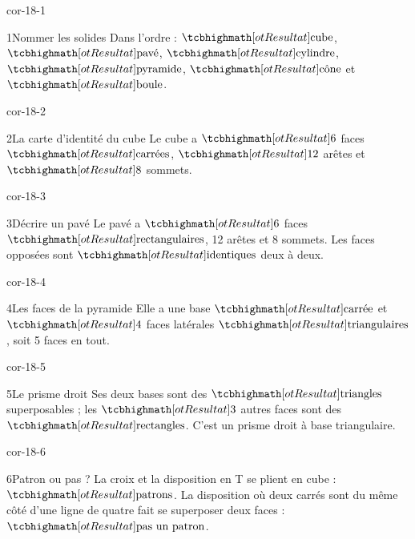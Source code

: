 \clearpage\pagestyle{otMain}\setlength{\otBlocEspacement}{2.5mm}\fontsize{11}{15}\selectfont{}
\begin{blocLivre}{cor-18-1}\begin{corrige}{1}{Nommer les solides}
Dans l’ordre : $\res{\text{cube}}$, $\res{\text{pavé}}$, $\res{\text{cylindre}}$, $\res{\text{pyramide}}$, $\res{\text{cône}}$ et $\res{\text{boule}}$.
\label{fig-cor-18-1}
\end{corrige}\end{blocLivre}
\begin{blocLivre}{cor-18-2}\begin{corrige}{2}{La carte d’identité du cube}
Le cube a $\res6$ faces $\res{\text{carrées}}$, $\res{12}$ arêtes et $\res8$ sommets.
\label{fig-cor-18-2}
\end{corrige}\end{blocLivre}
\begin{blocLivre}{cor-18-3}\begin{corrige}{3}{Décrire un pavé}
Le pavé a $\res6$ faces $\res{\text{rectangulaires}}$, 12 arêtes et 8 sommets. Les faces opposées sont $\res{\text{identiques}}$ deux à deux.
\label{fig-cor-18-3}
\end{corrige}\end{blocLivre}
\begin{blocLivre}{cor-18-4}\begin{corrige}{4}{Les faces de la pyramide}
Elle a une base $\res{\text{carrée}}$ et $\res4$ faces latérales $\res{\text{triangulaires}}$, soit 5 faces en tout.
\label{fig-cor-18-4}
\end{corrige}\end{blocLivre}
\begin{blocLivre}{cor-18-5}\begin{corrige}{5}{Le prisme droit}
Ses deux bases sont des $\res{\text{triangles}}$ superposables ; les $\res3$ autres faces sont des $\res{\text{rectangles}}$. C’est un prisme droit à base triangulaire.
\label{fig-cor-18-5}
\end{corrige}\end{blocLivre}
\begin{blocLivre}{cor-18-6}\begin{corrige}{6}{Patron ou pas ?}
La croix et la disposition en T se plient en cube : $\res{\text{patrons}}$. La disposition où deux carrés sont du même côté d’une ligne de quatre fait se superposer deux faces : $\res{\text{pas un patron}}$.
\label{fig-cor-18-6}
\end{corrige}\end{blocLivre}
